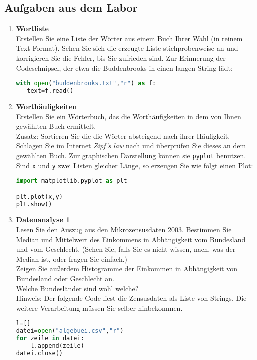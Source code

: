\subsection*{Aufgaben aus dem Labor}
\begin{enumerate}[1.]
\item \textbf{Wortliste}\\
Erstellen Sie eine Liste der Wörter aus einem Buch Ihrer Wahl 
(in reinem Text-Format). Sehen
Sie sich die erzeugte Liste stichprobenweise an und korrigieren Sie
die Fehler, bis Sie zufrieden sind.  Zur Erinnerung der Codeschnipsel,
der etwa die Buddenbrooks in einen langen String lädt:
\begin{lstlisting}[language=Python]
with open("buddenbrooks.txt","r") as f:
   text=f.read()
\end{lstlisting}
\item\textbf{Worthäufigkeiten}\\
Erstellen Sie ein Wörterbuch, das die Worthäufigkeiten in dem
von Ihnen gewählten Buch ermittelt.\\
Zusatz: Sortieren Sie die die Wörter absteigend nach ihrer Häufigkeit. \\ 
Schlagen Sie im Internet {\em Zipf's law} nach und überprüfen Sie dieses an 
dem gewählten Buch.  Zur graphischen Darstellung können sie \texttt{pyplot} benutzen. 
Sind \texttt{x} und \texttt{y} zwei Listen gleicher Länge, so erzeugen Sie wie
folgt einen Plot:
\begin{lstlisting}[language=Python]
import matplotlib.pyplot as plt

plt.plot(x,y)
plt.show()
\end{lstlisting}

\item \textbf{Datenanalyse 1}\\
Lesen Sie den Auszug aus den Mikrozensusdaten 2003.  Bestimmen Sie
Median und Mittelwert des Einkommens in Abhängigkeit vom
Bundesland und vom Geschlecht. (Sehen Sie, falls Sie es nicht
wissen, nach, was der Median ist, oder fragen Sie einfach.) \\
Zeigen Sie außerdem Histogramme der Einkommen in Abhängigkeit
von Bundesland oder Geschlecht an.  \\
Welche Bundesländer sind wohl welche?\\
Hinweis: Der folgende Code liest die Zensusdaten als Liste von Strings.
Die weitere Verarbeitung müssen Sie selber hinbekommen.
\begin{lstlisting}[language=Python]
l=[]
datei=open("algebuei.csv","r")
for zeile in datei:
    l.append(zeile)
datei.close()
\end{lstlisting}


\end{enumerate}
